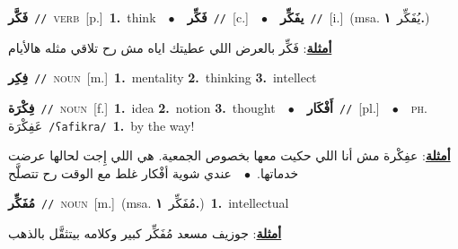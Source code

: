 \documentclass[10pt,a4paper,twoside]{article} %
\begin{document}
\begin{multicols}{2}
{\setlength\topsep{0pt}\textbf{\foreignlanguage{arabic}{فَكَّر}}\ {\color{gray}\texttt{//}\color{black}}\ \textsc{verb}\ [p.]\ \textbf{1.}~think\ \ $\bullet$\ \ \setlength\topsep{0pt}\textbf{\foreignlanguage{arabic}{فَكِّر}}\ {\color{gray}\texttt{//}\color{black}}\ [c.]\ \ $\bullet$\ \ \setlength\topsep{0pt}\textbf{\foreignlanguage{arabic}{يفَكِّر}}\ {\color{gray}\texttt{//}\color{black}}\ [i.]\ \color{gray}(msa. \foreignlanguage{arabic}{يُفَكِّر}~\foreignlanguage{arabic}{\textbf{١.}})\color{black}\  \begin{flushright}\color{gray}\foreignlanguage{arabic}{\textbf{\underline{\foreignlanguage{arabic}{أمثلة}}}: فَكِّر بالعرض اللي عطيتك اياه مش رح تلاقي مثله هالأيام}\end{flushright}\color{black}} \vspace{2mm}

{\setlength\topsep{0pt}\textbf{\foreignlanguage{arabic}{فِكِر}}\ {\color{gray}\texttt{//}\color{black}}\ \textsc{noun}\ [m.]\ \textbf{1.}~mentality  \textbf{2.}~thinking  \textbf{3.}~intellect\ } \vspace{2mm}

{\setlength\topsep{0pt}\textbf{\foreignlanguage{arabic}{فِكْرَة}}\ {\color{gray}\texttt{//}\color{black}}\ \textsc{noun}\ [f.]\ \textbf{1.}~idea  \textbf{2.}~notion  \textbf{3.}~thought\ \ $\bullet$\ \ \setlength\topsep{0pt}\textbf{\foreignlanguage{arabic}{أَفْكَار}}\ {\color{gray}\texttt{//}\color{black}}\ [pl.]\ \ $\bullet$\ \ \textsc{ph.} \color{gray} \foreignlanguage{arabic}{عَفِكْرَة}\color{black}\ {\color{gray}\texttt{/{\sffamily ʕafikra}/}\color{black}}\ \textbf{1.}~by the way!\  \begin{flushright}\color{gray}\foreignlanguage{arabic}{\textbf{\underline{\foreignlanguage{arabic}{أمثلة}}}: عفِكْرة مش أنا اللي حكيت معها بخصوص الجمعية. هي اللي إِجت لحالها عرضت خدماتها.\ $\bullet$\ \  عندي شوية أفْكار غلط مع الوقت رح تتصلَّح}\end{flushright}\color{black}} \vspace{2mm}

{\setlength\topsep{0pt}\textbf{\foreignlanguage{arabic}{مُفَكِّر}}\ {\color{gray}\texttt{//}\color{black}}\ \textsc{noun}\ [m.]\ \color{gray}(msa. \foreignlanguage{arabic}{مُفَكِّر}~\foreignlanguage{arabic}{\textbf{١.}})\color{black}\ \textbf{1.}~intellectual\  \begin{flushright}\color{gray}\foreignlanguage{arabic}{\textbf{\underline{\foreignlanguage{arabic}{أمثلة}}}: جوزيف مسعد مُفَكِّر كبير وكلامه بيتثقَّل بالذهب}\end{flushright}\color{black}} \vspace{2mm}


\end{multicols}
\end{document}

